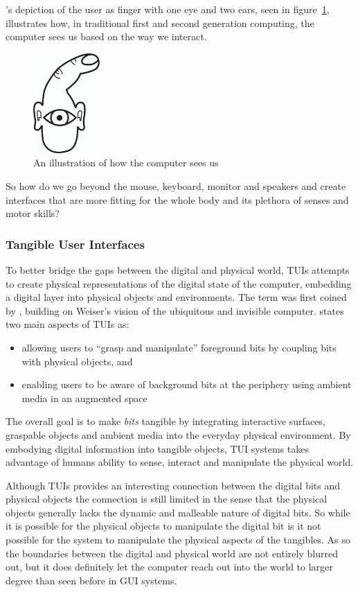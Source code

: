 \citet{o2004physical}'s depiction of the user as finger with one eye and two ears, seen in figure~\ref{finger-eye}, illustrates how, in traditional first and second generation computing, the computer sees us based on the way we interact. 

\begin{figure}[h]
  \centering
      \includegraphics[height=1.5in]{figures/igoefinger}
  \caption{An illustration of how the computer sees us \citep{o2004physical}}
   \label{finger-eye}
\end{figure}
So how do we go beyond the mouse, keyboard, monitor and speakers and create interfaces that are more fitting for the whole body and its plethora of senses and motor skills? 

\subsubsection{Tangible User Interfaces}
To better bridge the gaps between the digital and physical world, TUIs attempts to create physical representations of the digital state of the computer, embedding a digital layer into physical objects and environments.
The term was first coined by \citet{ishii1997tangible}, building on Weiser's vision of the ubiquitous and invisible computer.
\citeauthor{ishii1997tangible} states two main aspects of TUIs as:
\begin{itemize}
    \item{allowing users to ``grasp and manipulate'' foreground bits by coupling bits with physical objects, and}
    \item{enabling users to be aware of background bits at the periphery using ambient media in an augmented space}
\end{itemize}
The overall goal is to make \emph{bits} tangible by integrating interactive surfaces, graspable objects and ambient media into the everyday physical environment.
By embodying digital information into tangible objects, TUI systems takes advantage of humans ability to sense, interact and manipulate the physical world. 

Although TUIs provides an interesting connection between the digital bits and physical objects the connection is still limited in the sense that the physical objects generally lacks the dynamic and malleable nature of digital bits.
So while it is possible for the physical objects to manipulate the digital bit is it not possible for the system to manipulate the physical aspects of the tangibles.
As so the boundaries between the digital and physical world are not entirely blurred out, but it does definitely let the computer reach out into the world to larger degree than seen before in GUI systems. 

